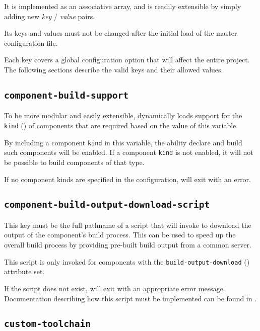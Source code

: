 It is implemented as an associative array, and is readily extensible
by simply adding new \emph{key} / \emph{value} pairs.

Its keys and values must not be changed after the initial load of the
master configuration file.

Each key covers a global configuration option that will affect the
entire project.  The following sections describe the valid keys and
their allowed values.


\subsection{\texttt{component-build-support}}\label{variables:component-build-support}

To be more modular and easily extensible, \lmsbw dynamically loads
support for the \texttt{kind} () of components
that are required based on the value of this variable.

By including a component \texttt{kind} in this variable, the ability
declare and build such components will be enabled.  If a component
\texttt{kind} is not enabled, it will not be possible to build
components of that type.

If no component kinds are specified in the configuration, \lmsbw will
exit with an error.

\subsection{\texttt{component-build-output-download-script}}
\label{variables:component-build-output-download-script}

This key must be the full pathname of a script that \lmsbw will invoke
to download the \destdir output of the component's build process.
This can be used to speed up the overall build process by providing
pre-built build output from a common server.

This script is only invoked for components with the
\texttt{build-output-download}
() attribute set.

If the script does not exist, \lmsbw will exit with an appropriate
error message.  Documentation describing how this script must be
implemented can be found in .

\subsection{\texttt{custom-toolchain}}\label{variables:custom-toolchain}

